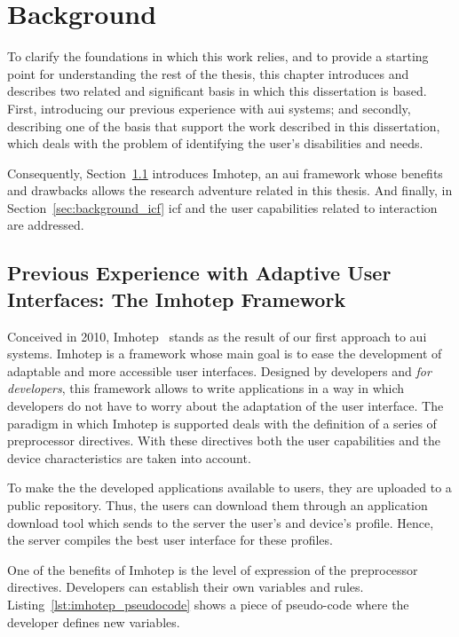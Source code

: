 \section{Background}
\label{sec:background}

To clarify the foundations in which this work relies, and to provide a starting 
point for understanding the rest of the thesis, this chapter introduces and 
describes two related and significant basis in which this dissertation is based. 
First, introducing our previous experience with \ac{aui} systems; and secondly, 
describing one of the basis that support the work described in this dissertation, 
which deals with the problem of identifying the user's disabilities and needs.

Consequently, Section~\ref{sec:background_imhotep} introduces Imhotep, an \ac{aui}
framework whose benefits and drawbacks allows the research adventure related
in this thesis. And finally, in Section~\ref{sec:background_icf} \ac{icf} and
the user capabilities related to interaction are addressed.

\subsection{Previous Experience with Adaptive User Interfaces: The Imhotep Framework}
\label{sec:background_imhotep}

Conceived in 2010, Imhotep~\citep{almeida_imhotep_2011} stands as the result of 
our first approach to \ac{aui} systems. Imhotep is a framework whose main goal
is to ease the development of adaptable and more accessible user interfaces. 
Designed by developers and \textit{for developers}, this framework allows to 
write applications in a way in which developers do not have to worry about the 
adaptation of the user interface. The paradigm in which Imhotep is supported 
deals with the definition of a series of preprocessor directives. With these 
directives both the user capabilities and the device characteristics are taken
into account. 

To make the the developed applications available to users, they are uploaded to 
a public repository. Thus, the users can download them through an application 
download tool which sends to the server the user's and device's profile. Hence, 
the server compiles the best user interface for these profiles.

One of the benefits of Imhotep is the level of expression of the preprocessor
directives. Developers can establish their own variables and rules.
Listing~\ref{lst:imhotep_pseudocode} shows a piece of pseudo-code where the
developer defines new variables.

